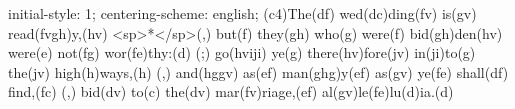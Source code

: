 initial-style: 1;
centering-scheme: english;
(c4)The(df) wed(dc)ding(fv) is(gv) read(fvgh)y,(hv) <sp>*</sp>(,) but(f) they(gh) who(g) were(f) bid(gh)den(hv) were(e) not(fg) wor(fe)thy:(d) (;) go(hviji) ye(g) there(hv)fore(jv) in(ji)to(g) the(jv) high(h)ways,(h) (,) and(hggv) as(ef) man(ghg)y(ef) as(gv) ye(fe) shall(df) find,(fc) (,) bid(dv) to(c) the(dv) mar(fv)riage,(ef) al(gv)le(fe)lu(d)ia.(d)
